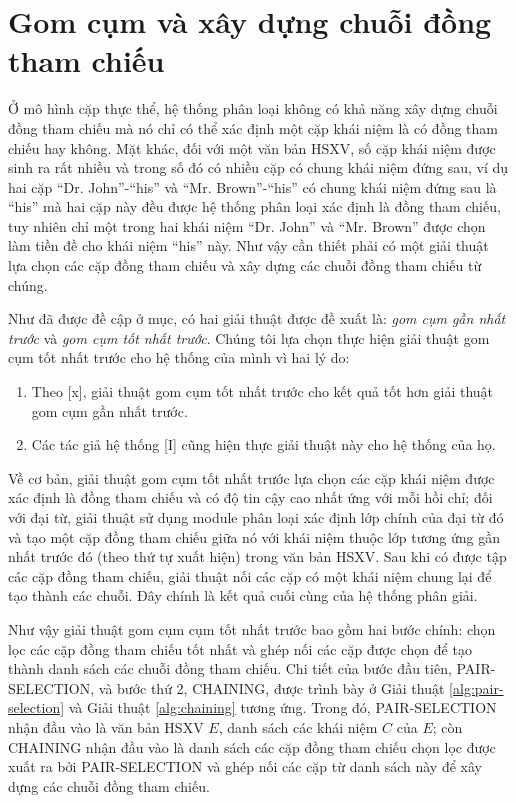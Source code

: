 \section{Gom cụm và xây dựng chuỗi đồng tham chiếu}
Ở mô hình cặp thực thể, hệ thống phân loại không có khả năng xây dựng chuỗi đồng tham chiếu mà nó chỉ có thể xác định một cặp khái niệm là có đồng tham chiếu hay không. Mặt khác, đối với một văn bản HSXV, số cặp khái niệm được sinh ra rất nhiều và trong số đó có nhiều cặp có chung khái niệm đứng sau, ví dụ hai cặp “Dr. John”-“his” và “Mr. Brown”-“his” có chung khái niệm đứng sau là “his” mà hai cặp này đều được hệ thống phân loại xác định là đồng tham chiếu, tuy nhiên chỉ một trong hai khái niệm “Dr. John” và “Mr. Brown” được chọn làm tiền đề cho khái niệm “his” này. Như vậy cần thiết phải có một giải thuật lựa chọn các cặp đồng tham chiếu và xây dựng các chuỗi đồng tham chiếu từ chúng.

Như đã được đề cập ở mục, có hai giải thuật được đề xuất là: \emph{gom cụm gần nhất trước} và \emph{gom cụm tốt nhất trước}. Chúng tôi lựa chọn thực hiện giải thuật gom cụm tốt nhất trước cho hệ thống của mình vì hai lý do:
\begin{enumerate}[leftmargin=\the\parindent]
\item Theo [x], giải thuật gom cụm tốt nhất trước cho kết quả tốt hơn giải thuật gom cụm gần nhất trước.
\item Các tác giả hệ thống [I] cũng hiện thực giải thuật này cho hệ thống của họ.
\end{enumerate}

Về cơ bản, giải thuật gom cụm tốt nhất trước lựa chọn các cặp khái niệm được xác định là đồng tham chiếu và có độ tin cậy cao nhất ứng với mỗi hồi chỉ; đối với đại từ, giải thuật sử dụng module phân loại xác định lớp chính của đại từ đó và tạo một cặp đồng tham chiếu giữa nó với khái niệm thuộc lớp tương ứng gần nhất trước đó (theo thứ tự xuất hiện) trong văn bản HSXV. Sau khi có được tập các cặp đồng tham chiếu, giải thuật nối các cặp có một khái niệm chung lại để tạo thành các chuỗi. Đây chính là kết quả cuối cùng của hệ thống phân giải.

Như vậy giải thuật gom cụm cụm tốt nhất trước bao gồm hai bước chính: chọn lọc các cặp đồng tham chiếu tốt nhất và ghép nối các cặp được chọn để tạo thành danh sách các chuỗi đồng tham chiếu. Chi tiết của bước đầu tiên, PAIR-SELECTION, và bước thứ 2, CHAINING, được trình bày ở Giải thuật \ref{alg:pair-selection} và Giải thuật \ref{alg:chaining} tương ứng. Trong đó, PAIR-SELECTION nhận đầu vào là văn bản HSXV $E$, danh sách các khái niệm $C$ của $E$; còn CHAINING nhận đầu vào là danh sách các cặp đồng tham chiếu chọn lọc được xuất ra bởi PAIR-SELECTION và ghép nối các cặp từ danh sách này để xây dựng các chuỗi đồng tham chiếu.

